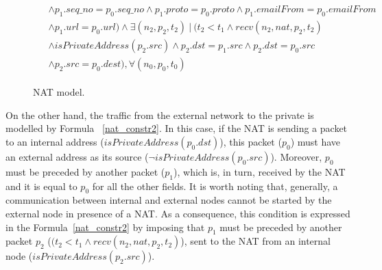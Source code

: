 \begin{figure}[h]
{\begin{subequations}
\begin{align}
\begin{split}
			& \wedge p_{1}.seq\_no = p_{0}.seq\_no \wedge p_{1}.proto = p_{0}.proto \wedge p_{1}.emailFrom = p_{0}.emailFrom \\
			& \wedge p_{1}.url = p_{0}.url) \wedge \exists (n_{2}, p_{2}, t_{2}) \: | \: (t_{2} < t_{1} \wedge recv(n_{2}, nat, p_{2}, t_{2}) \\
			& \wedge isPrivateAddress(p_{2}.src) \wedge p_{2}.dst = p_{1}.src \wedge p_{2}.dst = p_{0}.src \\
			& \wedge p_{2}.src = p_{0}.dest), \forall (n_{0}, p_{0}, t_{0})
			\end{split}
			\end{align}
		\end{subequations}
	}%
	\caption{NAT model.}
	\label{nat_model}
\end{figure}

On the other hand, the traffic from the external network to the private is modelled by Formula ~\ref{nat_constr2}. In this case, if the NAT is sending a packet to an internal address (\textit{$isPrivateAddress(p_{0}.dst)$}), this packet (\textit{$p_0$}) must have an external address as its source (\textit{$\neg isPrivateAddress(p_{0}.src)$}). Moreover, \textit{$p_0$} must be preceded by another packet (\textit{$p_1$}), which is, in turn, received by the NAT and it is equal to \textit{$p_0$} for all the other fields. It is worth noting that, generally, a communication between internal and external nodes cannot be started by the external node in presence of a NAT. As a consequence, this condition is expressed in the Formula~\ref{nat_constr2} by imposing that \textit{$p_1$} must be preceded by another packet \textit{$p_2$} (\textit{$(t_{2} < t_{1} \wedge recv(n_{2}, nat, p_{2}, t_{2})$}), sent to the NAT from an internal node (\textit{$isPrivateAddress(p_{2}.src)$}).

